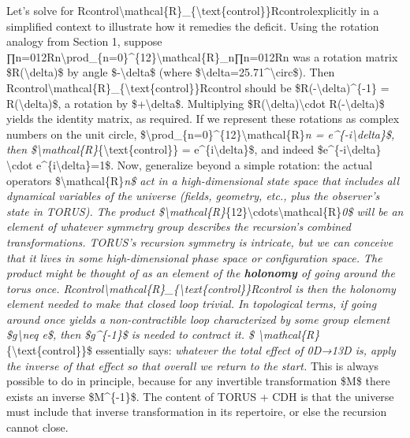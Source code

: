 \documentclass[]{article}
\begin{document}
Let's solve for
Rcontrol\textbackslash{}mathcal\{R\}\_\{\textbackslash{}text\{control\}\}Rcontrol​
explicitly in a simplified context to illustrate how it remedies the
deficit. Using the rotation analogy from Section 1, suppose
∏n=012Rn\textbackslash{}prod\_\{n=0\}\^{}\{12\}\textbackslash{}mathcal\{R\}\_n∏n=012​Rn​
was a rotation matrix \$R(\textbackslash{}delta)\$ by angle
\$-\textbackslash{}delta\$ (where
\$\textbackslash{}delta=25.71\^{}\textbackslash{}circ\$). Then
Rcontrol\textbackslash{}mathcal\{R\}\_\{\textbackslash{}text\{control\}\}Rcontrol​
should be \$R(-\textbackslash{}delta)\^{}\{-1\} =
R(\textbackslash{}delta)\$, a rotation by \$+\textbackslash{}delta\$.
Multiplying \$R(\textbackslash{}delta)\textbackslash{}cdot
R(-\textbackslash{}delta)\$ yields the identity matrix, as required. If
we represent these rotations as complex numbers on the unit circle,
\$\textbackslash{}prod\_\{n=0\}\^{}\{12\}\textbackslash{}mathcal\{R\}\emph{n
= e\^{}\{-i\textbackslash{}delta\}\$, then
\$\textbackslash{}mathcal\{R\}}\{\textbackslash{}text\{control\}\} =
e\^{}\{i\textbackslash{}delta\}\$, and indeed
\$e\^{}\{-i\textbackslash{}delta\} \textbackslash{}cdot
e\^{}\{i\textbackslash{}delta\}=1\$. Now, generalize beyond a simple
rotation: the actual operators \$\textbackslash{}mathcal\{R\}\emph{n\$
act in a high-dimensional state space that includes all dynamical
variables of the universe (fields, geometry, etc., plus the observer's
state in TORUS). The product
\$\textbackslash{}mathcal\{R\}}\{12\}\textbackslash{}cdots\textbackslash{}mathcal\{R\}\emph{0\$
will be an element of whatever symmetry group describes the recursion's
combined transformations. TORUS's recursion symmetry is intricate, but
we can conceive that it lives in some high-dimensional phase space or
configuration space. The product might be thought of as an element of
the \textbf{holonomy} of going around the torus once.
Rcontrol\textbackslash{}mathcal\{R\}\_\{\textbackslash{}text\{control\}\}Rcontrol​
is then the holonomy element needed to make that closed loop trivial. In
topological terms, if going around once yields a non-contractible loop
characterized by some group element \$g\textbackslash{}neq e\$, then
\$g\^{}\{-1\}\$ is needed to contract it. \$
\textbackslash{}mathcal\{R\}}\{\textbackslash{}text\{control\}\}\$
essentially says: \emph{whatever the total effect of 0D→13D is, apply
the inverse of that effect so that overall we return to the start.} This
is always possible to do in principle, because for any invertible
transformation \$M\$ there exists an inverse \$M\^{}\{-1\}\$. The
content of TORUS + CDH is that the universe must include that inverse
transformation in its repertoire, or else the recursion cannot close.
\end{document}
